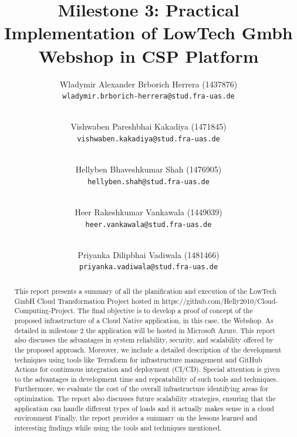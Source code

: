 \documentclass{llncs}
\newcommand{\what}{Milestone 3: Practical Implementation of LowTech Gmbh Webshop in CSP Platform}
\begin{document}
%
%
%
\mainmatter              %
%
\title{\what}
%
\author{
    Wladymir Alexander Brborich Herrera (1437876)\\
    \texttt{wladymir.brborich-herrera@stud.fra-uas.de}
    \and\\
    Vishwaben Pareshbhai Kakadiya (1471845)\\
    \texttt{vishwaben.kakadiya@stud.fra-uas.de}
    \and\\
    Hellyben Bhaveshkumar Shah (1476905)\\
    \texttt{hellyben.shah@stud.fra-uas.de}
    \and\\
    Heer Rakeshkumar Vankawala (1449039)
    \\
    \texttt{heer.vankawala@stud.fra-uas.de}
    \and\\
    Priyanka Dilipbhai Vadiwala (1481466)\\
    \texttt{priyanka.vadiwala@stud.fra-uas.de}
}
%

\maketitle              %

\begin{abstract}
    This report presents a summary of all the planification and execution of the LowTech GmbH Cloud Transformation Project hosted in  https://github.com/Helly2010/Cloud-Computing-Project.
    The final objective is to develop a proof of concept of the proposed infrastructure of a Cloud Native application, in this case,
    the Webshop. As detailed in milestone 2 the application will be hosted in Microsoft Azure. This report also discusses the advantages
    in system reliability, security, and scalability offered by the proposed approach.
    Moreover, we include a detailed description of the development techniques using tools like Terraform for infrastructure management and GitHub Actions for
    continuous integration and deployment (CI/CD). Special attention is given to the advantages in development time and repeatability of such tools and techniques.
    Furthermore, we evaluate the cost of the overall infrastructure identifying areas for optimization.
    The report also discusses future scalability strategies, ensuring that the application can handle different types of loads and it actually makes sense in a cloud environment
    Finally, the report provides a summary on the lessons learned and interesting findings while using the tools and techniques mentioned.

\end{abstract}
\end{document}
